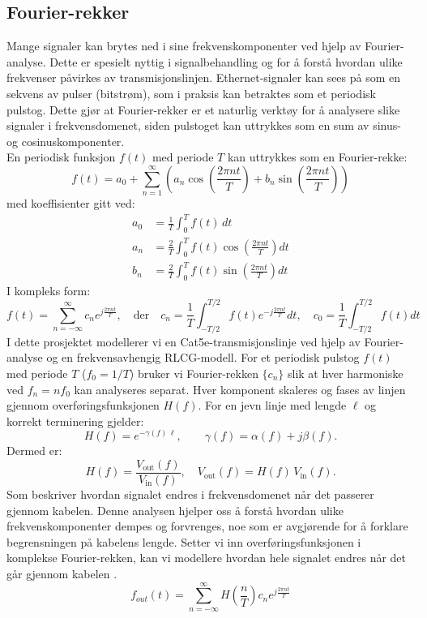 \subsection{Fourier-rekker}

Mange signaler kan brytes ned i sine frekvenskomponenter ved hjelp av Fourier-analyse. Dette er spesielt nyttig i signalbehandling og for å forstå hvordan ulike frekvenser påvirkes av transmisjonslinjen. Ethernet-signaler kan sees på som en sekvens av pulser (bitstrøm), som i praksis kan betraktes som et periodisk pulstog. Dette gjør at Fourier-rekker er et naturlig verktøy for å analysere slike signaler i frekvensdomenet, siden pulstoget kan uttrykkes som en sum av sinus- og cosinuskomponenter.\\[1em]
En periodisk funksjon $f(t)$ med periode $T$ kan uttrykkes som en Fourier-rekke:
\begin{equation}
f(t) = a_0 + \sum_{n=1}^{\infty} \left( a_n \cos\left(\frac{2\pi n t}{T}\right) + b_n \sin\left(\frac{2\pi n t}{T}\right) \right)
\end{equation}
med koeffisienter gitt ved:
\begin{align*}
a_0 &= \frac{1}{T} \int_{0}^{T} f(t) \, dt \\
a_n &= \frac{2}{T} \int_{0}^{T} f(t) \cos\left(\frac{2\pi n t}{T}\right) dt \\
b_n &= \frac{2}{T} \int_{0}^{T} f(t) \sin\left(\frac{2\pi n t}{T}\right) dt
\end{align*}
I kompleks form:
\begin{equation}
f(t) = \sum_{n=-\infty}^{\infty} c_n e^{j \frac{2\pi n t}{T}}, \quad \text{der} \quad c_n = \frac{1}{T} \int_{-T/2}^{T/2} f(t) e^{-j \frac{2\pi n t}{T}} dt, \quad c_0 = \frac{1}{T} \int_{-T/2}^{T/2} f(t) dt
\end{equation}
I dette prosjektet modellerer vi en Cat5e-transmisjonslinje ved hjelp av Fourier-analyse
og en frekvensavhengig RLCG-modell. For et periodisk pulstog \(f(t)\) med periode \(T\)
(\(f_0=1/T\)) bruker vi Fourier-rekken \(\{c_n\}\) slik at hver harmoniske ved
\(f_n=nf_0\) kan analyseres separat. Hver komponent skaleres og fases av linjen gjennom
overføringsfunksjonen \(H(f)\). For en jevn linje med lengde \(\ell\) og korrekt terminering
gjelder:
\[
H(f)=e^{-\gamma(f)\,\ell},\qquad \gamma(f)=\alpha(f)+j\beta(f).
\]
Dermed er:
\[
H(f)=\frac{V_{\text{out}}(f)}{V_{\text{in}}(f)},\quad
V_{\text{out}}(f)=H(f)\,V_{\text{in}}(f).
\]
Som beskriver hvordan signalet endres i frekvensdomenet når det passerer gjennom kabelen.
Denne analysen hjelper oss å forstå hvordan ulike frekvenskomponenter dempes og forvrenges, noe som er avgjørende for å forklare begrensningen på kabelens lengde.
Setter vi inn overføringsfunksjonen i komplekse Fourier-rekken, kan vi modellere hvordan hele signalet endres når det går gjennom kabelen \cite{engineering_mathematics}.
\begin{equation}
    f_{out}(t) = \sum_{n=-\infty}^{\infty} H\left(\frac{n}{T}\right) c_n e^{j \frac{2\pi n t}{T}}
\end{equation}

